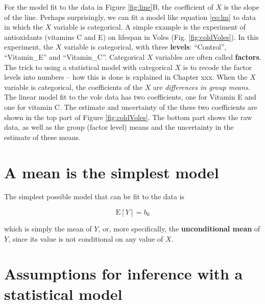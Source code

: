 \documentclass[]{book}
\begin{document}
For the model fit to the data in Figure \ref{fig:line}B, the coefficient
of \(X\) is the slope of the line. Perhaps surprisingly, we can fit a
model like equation \eqref{eq:lm} to data in which the \(X\) variable is
categorical. A simple example is the experiment of antioxidants
(vitamins C and E) on lifespan in Voles (Fig. \ref{fig:coldVoles}). In
this experiment, the \(X\) variable is categorical, with three
\textbf{levels}: ``Control'', ``Vitamin\_E'' and ``Vitamin\_C''.
Categorical \(X\) variables are often called \textbf{factors}. The trick
to using a statistical model with categorical \(X\) is to recode the
factor levels into numbers -- how this is done is explained in Chapter
xxx. When the \(X\) variable is categorical, the coefficients of the
\(X\) are \emph{differences in group means}. The linear model fit to the
vole data has two coefficients, one for Vitamin E and one for vitamin C.
The estimate and uncertainty of the these two coefficients are shown in
the top part of Figure \ref{fig:coldVoles}. The bottom part shows the
raw data, as well as the group (factor level) means and the uncertainty
in the estimate of these means.

\section{A mean is the simplest
model}\label{a-mean-is-the-simplest-model}

The simplest possible model that can be fit to the data is

\begin{equation}
\mathrm{E}[Y] = b_0
\label{eq:unconditional}
\end{equation}

which is simply the mean of \(Y\), or, more specifically, the
\textbf{unconditional mean} of \(Y\), since its value is not conditional
on any value of \(X\).

\section{Assumptions for inference with a statistical
model}\label{assumptions-for-inference-with-a-statistical-model}
\end{document}
